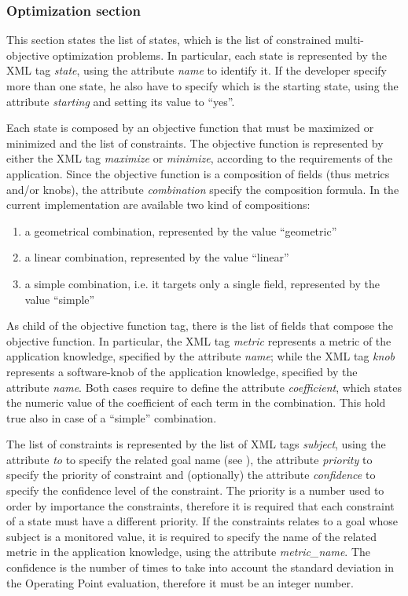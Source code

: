 \subsubsection*{Optimization section}

This section states the list of states, which is the list of constrained multi-objective optimization problems.
In particular, each state is represented by the XML tag \textit{state}, using the attribute \textit{name} to identify it.
If the developer specify more than one state, he also have to specify which is the starting state, using the attribute \textit{starting} and setting its value to ``yes''.


Each state is composed by an objective function that must be maximized or minimized and the list of constraints.
The objective function is represented by either the XML tag \textit{maximize} or \textit{minimize}, according to the requirements of the application.
Since the objective function is a composition of fields (thus metrics and/or knobs), the attribute \textit{combination} specify the composition formula.
In the current implementation are available two kind of compositions:
\begin{enumerate}
	\item a geometrical combination, represented by the value ``geometric''
	\item a linear combination, represented by the value ``linear''
	\item a simple combination, i.e. it targets only a single field, represented by the value ``simple''
\end{enumerate}
As child  of the objective function tag, there is the list of fields that compose the objective function.
In particular, the XML tag \textit{metric} represents a metric of the application knowledge, specified by the attribute \textit{name}; while the XML tag \textit{knob} represents a software-knob of the application knowledge, specified by the attribute \textit{name}.
Both cases require to define the attribute \textit{coefficient}, which states the numeric value of the coefficient of each term in the combination.
This hold true also in case of a ``simple'' combination.


The list of constraints is represented by the list of XML tags \textit{subject}, using the attribute \textit{to} to specify the related goal name (see ), the attribute \textit{priority} to specify the priority of constraint and (optionally) the attribute \textit{confidence} to specify the confidence level of the constraint.
The priority is a number used to order by importance the constraints, therefore it is required that each constraint of a state must have a different priority.
If the constraints relates to a goal whose subject is a monitored value, it is required to specify the name of the related metric in the application knowledge, using the attribute \textit{metric\_name}.
The confidence is the number of times to take into account the standard deviation in the Operating Point evaluation, therefore it must be an integer number.
